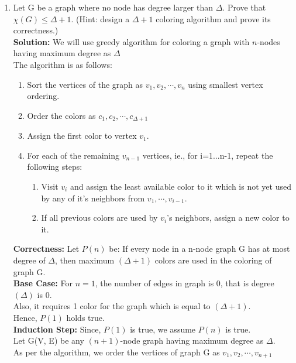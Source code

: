 \documentclass[12pt]{article}
\begin{document}
\begin{enumerate}
\begin{enumerate}
\item Let G be a graph where no node has degree larger than $\Delta$. Prove that $\chi(G) \le \Delta + 1$. (Hint: design a $\Delta + 1$ coloring algorithm and prove its correctness.) \\
\textbf{Solution:} We will use greedy algorithm for coloring a graph with $n$-nodes having maximum degree as $\Delta$\\
The algorithm is as follows:\\
\begin{enumerate}
\item Sort the vertices of the graph as $v_1,v_2,\cdots,v_n$ using smallest vertex ordering.\\
\item Order the colors as $c_1,c_2,\cdots,c_{\Delta+1}$\\
\item Assign the first color to vertex $v_1$.\\
\item For each of the remaining $v_{n-1}$ vertices, ie., for i=1...n-1, repeat the following steps:\\
\begin{enumerate}
\item Visit $v_i$ and assign the least available color to it which is not yet used by any of it's neighbors from $v_1,\cdots,v_{i-1}$. \\
\item If all previous colors are used by $v_i$'s neighbors, assign a new color to it.\\
\end{enumerate}
\end{enumerate}
\textbf{Correctness:} Let $P(n)$ be: If every node in a n-node graph G has at most degree of $\Delta$, then maximum $(\Delta + 1)$ colors are used in the coloring of graph G.\\
\textbf{Base Case:} For $n=1$, the number of edges in graph is 0, that is degree$(\Delta)$ is 0.\\
Also, it requires 1 color for the graph which is equal to $(\Delta + 1)$.\\
Hence, $P(1)$ holds true.\\
\textbf{Induction Step:} Since, $P(1)$ is true, we assume $P(n)$ is true.\\
Let G(V, E) be any $(n+1)$-node graph having maximum degree as $\Delta$.\\
As per the algorithm, we order the vertices of graph G as $v_1, v_2, \cdots, v_{n+1}$ \\

\end{enumerate}
\end{enumerate}
\end{document}
